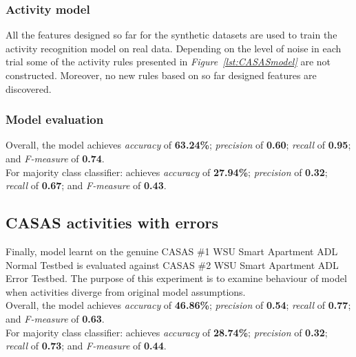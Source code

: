 \documentclass[10pt, a4paper, pdflatex, leqno, twoside, openright]{report}
\begin{document}
      \subsubsection{Activity model}
All the features designed so far for the synthetic datasets are used to train the activity recognition model on real data. Depending on the level of noise in each trial some of the activity rules presented in \emph{Figure~\ref{lst:CASASmodel}} are not constructed. Moreover, no new rules based on so far designed features are discovered.

      \subsubsection{Model evaluation}
Overall, the model achieves \emph{accuracy} of \textbf{63.24\%}; \emph{precision} of \textbf{0.60}; \emph{recall} of \textbf{0.95}; and \emph{F-measure} of \textbf{0.74}.\\

For majority class classifier: achieves \emph{accuracy} of \textbf{27.94\%}; \emph{precision} of \textbf{0.32}; \emph{recall} of \textbf{0.67}; and \emph{F-measure} of \textbf{0.43}.

    \subsection{CASAS activities with errors}
Finally, model learnt on the genuine CASAS \#1 WSU Smart Apartment ADL Normal Testbed is evaluated against CASAS \#2 WSU Smart Apartment ADL Error Testbed. The purpose of this experiment is to examine behaviour of model when activities diverge from original model assumptions.\\

Overall, the model achieves \emph{accuracy} of \textbf{46.86\%}; \emph{precision} of \textbf{0.54}; \emph{recall} of \textbf{0.77}; and \emph{F-measure} of \textbf{0.63}.\\

For majority class classifier: achieves \emph{accuracy} of \textbf{28.74\%}; \emph{precision} of \textbf{0.32}; \emph{recall} of \textbf{0.73}; and \emph{F-measure} of \textbf{0.44}.
\end{document}
